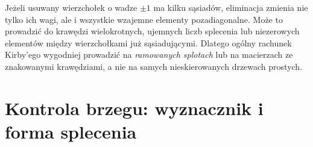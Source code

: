 \begin{center}
\end{center}

\begin{uwaga}
Jeżeli usuwany wierzchołek o wadze $\pm1$ ma
kilku sąsiadów, eliminacja zmienia nie tylko ich
wagi, ale i wszystkie wzajemne elementy pozadiagonalne.
Może to prowadzić do krawędzi wielokrotnych,
ujemnych liczb splecenia lub niezerowych elementów
między wierzchołkami już sąsiadującymi. Dlatego
ogólny rachunek Kirby'ego wygodniej prowadzić
na \emph{ramowanych splotach} lub na macierzach
ze znakowanymi krawędziami, a nie na samych
nieskierowanych drzewach prostych.
\end{uwaga}

\section{Kontrola brzegu: wyznacznik i forma splecenia}
\label{sec:tg-kirby-linking}

